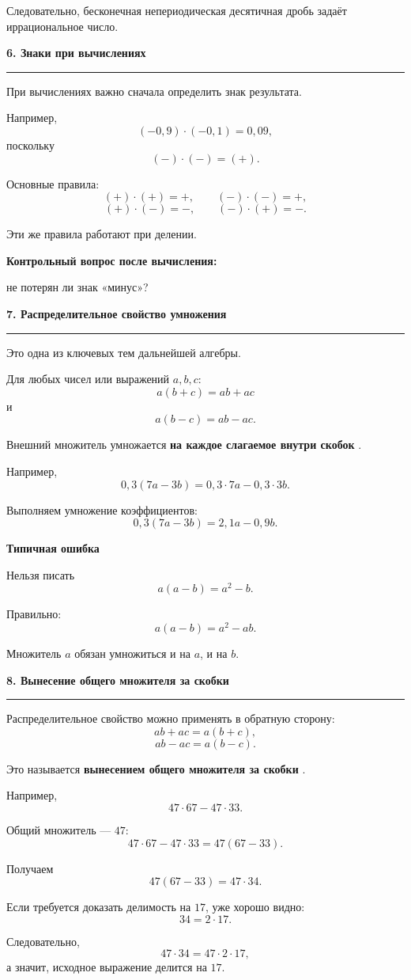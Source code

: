 \documentclass[a4paper,12pt]{article}
\newcommand{\sectiontitle}[1]{%
    \vspace{0.8em}
    {\Large\bfseries\textcolor{darkaccent}{#1}}\par
    \vspace{0.25em}
    \textcolor{accent}{\rule{\linewidth}{0.7pt}}
    \vspace{0.5em}
}
\newcommand{\subsectiontitle}[1]{%
    \vspace{0.6em}
    {\large\bfseries\textcolor{accent}{#1}}\par
    \vspace{0.2em}
}
\newcommand{\important}[1]{%
    \textbf{\textcolor{darkaccent}{#1}}
}
\begin{document}
Следовательно, бесконечная непериодическая десятичная дробь задаёт
иррациональное число.

\sectiontitle{6. Знаки при вычислениях}

При вычислениях важно сначала определить знак результата.

Например,
\[
(-0,9)\cdot(-0,1)=0,09,
\]
поскольку
\[
(-)\cdot(-)=(+).
\]

Основные правила:
\[
(+)\cdot(+)=+,\qquad
(-)\cdot(-)=+,
\]
\[
(+)\cdot(-)=-,\qquad
(-)\cdot(+)=-.
\]

Эти же правила работают при делении.

\important{Контрольный вопрос после вычисления:}
не потерян ли знак «минус»?

\sectiontitle{7. Распределительное свойство умножения}

Это одна из ключевых тем дальнейшей алгебры.

Для любых чисел или выражений \(a,b,c\):
\[
\boxed{a(b+c)=ab+ac}
\]
и
\[
\boxed{a(b-c)=ab-ac}.
\]

Внешний множитель умножается
\important{на каждое слагаемое внутри скобок}.

Например,
\[
0,3(7a-3b)
=
0,3\cdot7a-0,3\cdot3b.
\]

Выполняем умножение коэффициентов:
\[
\boxed{0,3(7a-3b)=2,1a-0,9b}.
\]

\subsectiontitle{Типичная ошибка}

Нельзя писать
\[
a(a-b)=a^2-b.
\]

Правильно:
\[
\boxed{a(a-b)=a^2-ab}.
\]

Множитель \(a\) обязан умножиться и на \(a\), и на \(b\).

\sectiontitle{8. Вынесение общего множителя за скобки}

Распределительное свойство можно применять в обратную сторону:
\[
ab+ac=a(b+c),
\]
\[
ab-ac=a(b-c).
\]

Это называется \important{вынесением общего множителя за скобки}.

Например,
\[
47\cdot67-47\cdot33.
\]

Общий множитель --- \(47\):
\[
47\cdot67-47\cdot33
=
47(67-33).
\]

Получаем
\[
47(67-33)=47\cdot34.
\]

Если требуется доказать делимость на \(17\), уже хорошо видно:
\[
34=2\cdot17.
\]

Следовательно,
\[
47\cdot34
=
47\cdot2\cdot17,
\]
а значит, исходное выражение делится на \(17\).
\end{document}
